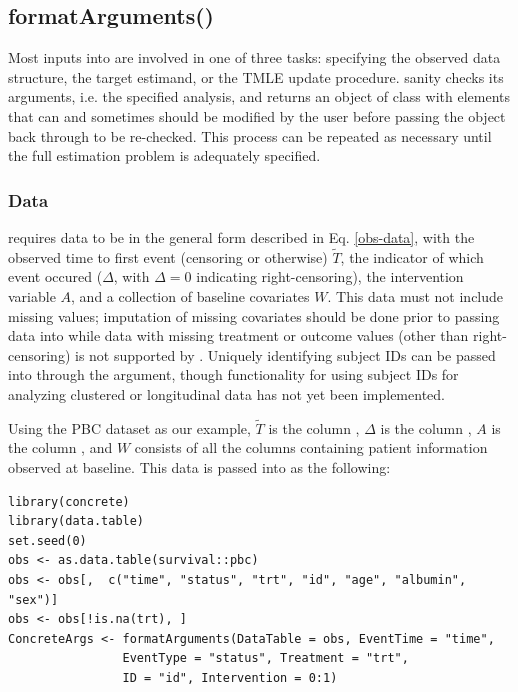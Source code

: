 \documentclass{report}
\newcommand{\1}{\ensuremath{\mathbf{1}}}
\newcommand{\T}{\ensuremath{\widetilde{T}}}
\renewcommand{\L}{\ensuremath{W}}
\begin{document}
\subsection{formatArguments()}
\label{formatArguments}
Most inputs into  are involved in one of three tasks: specifying the observed data structure, the target estimand, or the TMLE update procedure.  sanity checks its arguments, i.e. the specified analysis, and returns an object of class  with elements that can and sometimes should be modified by the user before passing the  object back through  to be re-checked. This process can be repeated as necessary until the full estimation problem is adequately specified.

\subsubsection{Data}
\label{ObservedDataConcrete}
 requires data to be in the general form described in Eq. \eqref{obs-data}, with the observed time to first event (censoring or otherwise) \(\T\), the indicator of which event occured (\(\Delta\), with \(\Delta = 0\) indicating right-censoring), the intervention variable \(A\), and a collection of baseline covariates \(\L\). This data must not include missing values; imputation of missing covariates should be done prior to passing data into  while data with missing treatment or outcome values (other than right-censoring) is not supported by . Uniquely identifying subject IDs can be passed into  through the  argument, though functionality for using subject IDs for analyzing clustered or longitudinal data has not yet been implemented.

Using the PBC dataset as our example, \(\T\) is the column , \(\Delta\) is the column , \(A\) is the column , and \(\L\) consists of all the columns containing patient information observed at baseline.  This data is passed into  as the following:
\begin{lstlisting}
library(concrete)
library(data.table)
set.seed(0)
obs <- as.data.table(survival::pbc)
obs <- obs[,  c("time", "status", "trt", "id", "age", "albumin", "sex")]
obs <- obs[!is.na(trt), ]
ConcreteArgs <- formatArguments(DataTable = obs, EventTime = "time",
				EventType = "status", Treatment = "trt",
				ID = "id", Intervention = 0:1)
\end{lstlisting}
\end{document}
